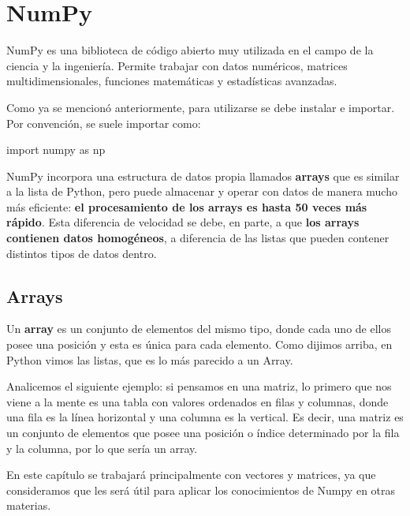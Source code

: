 \documentclass[
  letterpaper,
  DIV=11,
  numbers=noendperiod]{scrreprt}
\newenvironment{Shaded}{\begin{snugshade}}{\end{snugshade}}
\newcommand{\ImportTok}[1]{\textcolor[rgb]{0.00,0.46,0.62}{#1}}
\newcommand{\NormalTok}[1]{\textcolor[rgb]{0.00,0.23,0.31}{#1}}
\begin{document}
\section{NumPy}\label{numpy}

NumPy es una biblioteca de código abierto muy utilizada en el campo de
la ciencia y la ingeniería. Permite trabajar con datos numéricos,
matrices multidimensionales, funciones matemáticas y estadísticas
avanzadas.

Como ya se mencionó anteriormente, para utilizarse se debe instalar e
importar. Por convención, se suele importar como:

\begin{Shaded}
\begin{Highlighting}[]
\ImportTok{import}\NormalTok{ numpy }\ImportTok{as}\NormalTok{ np}
\end{Highlighting}
\end{Shaded}

NumPy incorpora una estructura de datos propia llamados \textbf{arrays}
que es similar a la lista de Python, pero puede almacenar y operar con
datos de manera mucho más eficiente: \textbf{el procesamiento de los
arrays es hasta 50 veces más rápido}. Esta diferencia de velocidad se
debe, en parte, a que \textbf{los arrays contienen datos homogéneos}, a
diferencia de las listas que pueden contener distintos tipos de datos
dentro.

\subsection{\texorpdfstring{\textbf{Arrays}}{Arrays}}\label{arrays}

Un \textbf{array} es un conjunto de elementos del mismo tipo, donde cada
uno de ellos posee una posición y esta es única para cada elemento. Como
dijimos arriba, en Python vimos las listas, que es lo más parecido a un
Array.

Analicemos el siguiente ejemplo: si pensamos en una matriz, lo primero
que nos viene a la mente es una tabla con valores ordenados en filas y
columnas, donde una fila es la línea horizontal y una columna es la
vertical. Es decir, una matriz es un conjunto de elementos que posee una
posición o índice determinado por la fila y la columna, por lo que sería
un array.

En este capítulo se trabajará principalmente con vectores y matrices, ya
que consideramos que les será útil para aplicar los conocimientos de
Numpy en otras materias.
\end{document}
